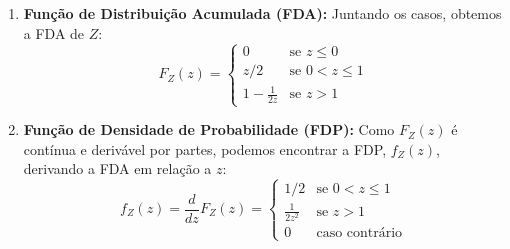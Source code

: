 \documentclass{article}
\begin{document}
\begin{enumerate}
		\item \textbf{Função de Distribuição Acumulada (FDA):}
		Juntando os casos, obtemos a FDA de $Z$:
		\[
		F_Z(z) = 
		\begin{cases} 
			0 & \text{se } z \le 0 \\
			z/2 & \text{se } 0 < z \le 1 \\
			1 - \frac{1}{2z} & \text{se } z > 1 
		\end{cases}
		\]
		
		\item \textbf{Função de Densidade de Probabilidade (FDP):}
		Como $F_Z(z)$ é contínua e derivável por partes, podemos encontrar a FDP, $f_Z(z)$, derivando a FDA em relação a $z$:
		\[
		f_Z(z) = \frac{d}{dz}F_Z(z) =
		\begin{cases} 
			1/2 & \text{se } 0 < z \le 1 \\
			\frac{1}{2z^2} & \text{se } z > 1 \\
			0 & \text{caso contrário}
		\end{cases}
		\]
	\end{enumerate}
	
\end{document}
